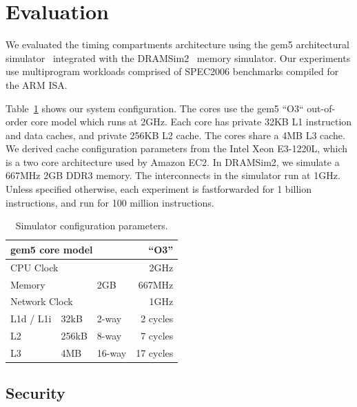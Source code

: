 \section{Evaluation}

We evaluated the timing compartments architecture using the gem5 architectural 
simulator~\cite{gem5} integrated with the DRAMSim2~\cite{DRAMSim2} memory 
simulator. Our experiments use multiprogram workloads comprised of SPEC2006 
benchmarks compiled for the ARM ISA. 

Table~\ref{tab:config} shows our system configuration.
The cores use the gem5 ``O3`` out-of-order core model which runs at 2GHz.  Each 
core has private 32KB L1 instruction and data caches, and private 256KB L2 
cache. The cores share a 4MB L3 cache. We derived cache configuration 
parameters from the Intel Xeon E3-1220L, which is a two core architecture used 
by Amazon EC2. In DRAMSim2, we simulate a 667MHz 2GB DDR3 memory. The 
interconnects in the simulator run at 1GHz. Unless specified otherwise, each 
experiment is fastforwarded for 1 billion instructions, and run for 100 million 
instructions. 


\begin{table}
    \caption{Simulator configuration parameters.}
    \centering
\begin{small}
    \begin{tabular}{|l|l|l|r|}
        \hline
        \multicolumn{3}{|l|}{gem5 core model} & ``O3''        \\\hline
        \multicolumn{3}{|l|}{CPU Clock}    & 2GHz             \\\hline
        \hline
        \multicolumn{2}{|l|}{Memory}             & 2GB    & 667MHz  \\\hline
        \hline
        \multicolumn{3}{|l|}{Network Clock}      & 1GHz \\\hline
        \hline
        L1d / L1i  & 32kB   & 2-way  & 2 cycles\\\hline
        L2         & 256kB  & 8-way  & 7 cycles \\\hline
        L3         & 4MB    & 16-way & 17 cycles  \\\hline
    \end{tabular}
    \end{small}
    \label{tab:config}
\end{table}

\subsection{Security}

